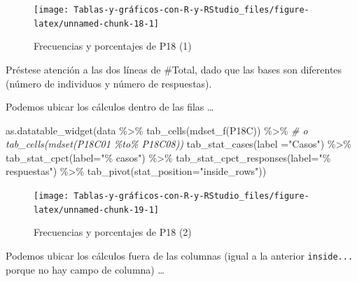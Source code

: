 \documentclass[
]{book}
\newenvironment{Shaded}{\begin{snugshade}}{\end{snugshade}}
\newcommand{\AttributeTok}[1]{\textcolor[rgb]{0.77,0.63,0.00}{#1}}
\newcommand{\CommentTok}[1]{\textcolor[rgb]{0.56,0.35,0.01}{\textit{#1}}}
\newcommand{\FunctionTok}[1]{\textcolor[rgb]{0.00,0.00,0.00}{#1}}
\newcommand{\NormalTok}[1]{#1}
\newcommand{\SpecialCharTok}[1]{\textcolor[rgb]{0.00,0.00,0.00}{#1}}
\newcommand{\StringTok}[1]{\textcolor[rgb]{0.31,0.60,0.02}{#1}}
\begin{document}
\begin{figure}[H]

{\centering \texttt{[image: Tablas-y-gráficos-con-R-y-RStudio\_files/figure-latex/unnamed-chunk-18-1]} 

}

\caption{Frecuencias y porcentajes de P18 (1)}\label{fig:unnamed-chunk-18}
\end{figure}

Préstese atención a las dos líneas de \#Total, dado que las bases son diferentes (número de individuos y número de respuestas).

Podemos ubicar los cálculos dentro de las filas \ldots{}

\begin{Shaded}
\begin{Highlighting}[]
\FunctionTok{as.datatable\_widget}\NormalTok{(data }\SpecialCharTok{\%\textgreater{}\%} 
  \FunctionTok{tab\_cells}\NormalTok{(}\FunctionTok{mdset\_f}\NormalTok{(P18C)) }\SpecialCharTok{\%\textgreater{}\%}  \CommentTok{\# o tab\_cells(mdset(P18C01 \%to\% P18C08))}
  \FunctionTok{tab\_stat\_cases}\NormalTok{(}\AttributeTok{label =}\StringTok{"Casos"}\NormalTok{) }\SpecialCharTok{\%\textgreater{}\%} 
  \FunctionTok{tab\_stat\_cpct}\NormalTok{(}\AttributeTok{label=}\StringTok{"\% casos"}\NormalTok{) }\SpecialCharTok{\%\textgreater{}\%} 
  \FunctionTok{tab\_stat\_cpct\_responses}\NormalTok{(}\AttributeTok{label=}\StringTok{"\% respuestas"}\NormalTok{) }\SpecialCharTok{\%\textgreater{}\%} 
  \FunctionTok{tab\_pivot}\NormalTok{(}\AttributeTok{stat\_position=}\StringTok{"inside\_rows"}\NormalTok{))}
\end{Highlighting}
\end{Shaded}

\begin{figure}[H]

{\centering \texttt{[image: Tablas-y-gráficos-con-R-y-RStudio\_files/figure-latex/unnamed-chunk-19-1]} 

}

\caption{Frecuencias y porcentajes de P18 (2)}\label{fig:unnamed-chunk-19}
\end{figure}

Podemos ubicar los cálculos fuera de las columnas (igual a la anterior \texttt{inside...} porque no hay campo de columna) \ldots{}
\end{document}
